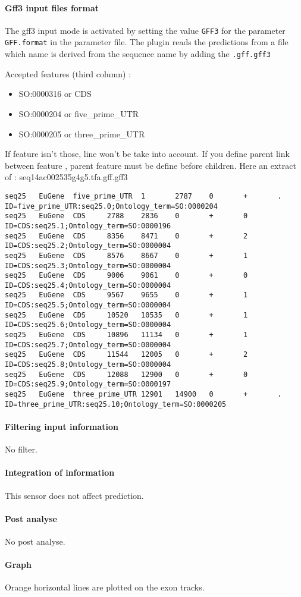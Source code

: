 \paragraph{Gff3 input files format}
The gff3 input mode is activated by setting the value \texttt{GFF3} for the parameter
\texttt{GFF.format} in the parameter file.
The plugin reads the predictions from a file which
name is derived from the sequence name by adding the \texttt{.gff.gff3}

Accepted features (third column) :
\begin{itemize}
\item  SO:0000316 or CDS
\item  SO:0000204 or five\_prime\_UTR
\item  SO:0000205 or three\_prime\_UTR
\end{itemize}
If feature isn't those, line won't be take into account.
If you define parent link between feature , parent feature must be define before children.
Here an extract of : seq14ac002535g4g5.tfa.gff.gff3
\begin{Verbatim}[fontsize=\tiny]
seq25   EuGene  five_prime_UTR  1       2787    0       +       .       ID=five_prime_UTR:seq25.0;Ontology_term=SO:0000204
seq25   EuGene  CDS     2788    2836    0       +       0       ID=CDS:seq25.1;Ontology_term=SO:0000196
seq25   EuGene  CDS     8356    8471    0       +       2       ID=CDS:seq25.2;Ontology_term=SO:0000004
seq25   EuGene  CDS     8576    8667    0       +       1       ID=CDS:seq25.3;Ontology_term=SO:0000004
seq25   EuGene  CDS     9006    9061    0       +       0       ID=CDS:seq25.4;Ontology_term=SO:0000004
seq25   EuGene  CDS     9567    9655    0       +       1       ID=CDS:seq25.5;Ontology_term=SO:0000004
seq25   EuGene  CDS     10520   10535   0       +       1       ID=CDS:seq25.6;Ontology_term=SO:0000004
seq25   EuGene  CDS     10896   11134   0       +       1       ID=CDS:seq25.7;Ontology_term=SO:0000004
seq25   EuGene  CDS     11544   12005   0       +       2       ID=CDS:seq25.8;Ontology_term=SO:0000004
seq25   EuGene  CDS     12088   12900   0       +       0       ID=CDS:seq25.9;Ontology_term=SO:0000197
seq25   EuGene  three_prime_UTR 12901   14900   0       +       .       ID=three_prime_UTR:seq25.10;Ontology_term=SO:0000205
\end{Verbatim}


\paragraph{Filtering input information}

No filter.

\paragraph{Integration of information}

This sensor does not affect prediction.

\paragraph{Post analyse}

No post analyse.

\paragraph{Graph}

Orange horizontal lines are plotted on the exon tracks.

